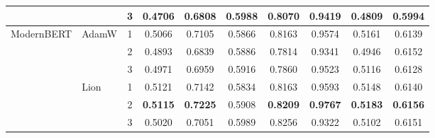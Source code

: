 \documentclass[conference]{IEEEtran}
\begin{document}
\begin{table}[t]
\begin{tabular}{llcccccccc}
 & & 3 & 0.4706 & 0.6808 & \textbf{0.5988} & 0.8070 & 0.9419 & 0.4809 & 0.5994 \\
\midrule
\multirow{6}{*}{ModernBERT} & \multirow{3}{*}{AdamW} 
 & 1 & 0.5066 & 0.7105 & 0.5866 & 0.8163 & 0.9574 & 0.5161 & 0.6139 \\
 & & 2 & 0.4893 & 0.6839 & 0.5886 & 0.7814 & 0.9341 & 0.4946 & 0.6152 \\
 & & 3 & 0.4971 & 0.6959 & 0.5916 & 0.7860 & 0.9523 & 0.5116 & 0.6128 \\
\cmidrule{2-10}
 & \multirow{3}{*}{Lion} 
 & 1 & 0.5121 & 0.7142 & 0.5834 & 0.8163 & 0.9593 & 0.5148 & 0.6140 \\
 & & 2 & \textbf{0.5115} & \textbf{0.7225} & 0.5908 & \textbf{0.8209} & \textbf{0.9767} & \textbf{0.5183} & \textbf{0.6156} \\
 & & 3 & 0.5020 & 0.7051 & 0.5989 & 0.8256 & 0.9322 & 0.5102 & 0.6151 \\
\bottomrule
\end{tabular}
\end{table}
\end{document}
